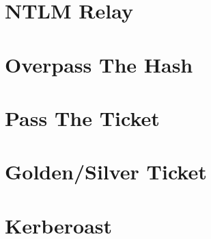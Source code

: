 \begin{enumerate}
\end{enumerate}

\section{NTLM Relay}

\section{Overpass The Hash}

\section{Pass The Ticket}

\section{Golden/Silver Ticket}

\section{Kerberoast}

